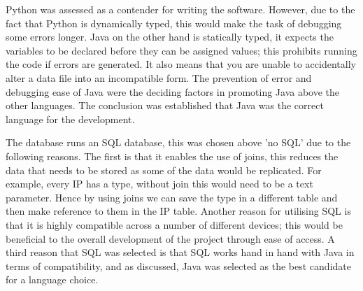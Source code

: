 Python was assessed as a contender for writing the software. However, due to the fact that Python is dynamically typed, this would make the task of debugging some errors longer. Java on the other hand is statically typed, it expects the variables to be declared before they can be assigned values; this prohibits running the code if errors are generated. It also means that you are unable to accidentally alter a data file into an incompatible form. The prevention of error and debugging ease of Java were the deciding factors in promoting Java above the other languages. The conclusion was established that Java was the correct language for the development. 

The database runs an SQL database, this was chosen above 'no SQL' due to the following reasons. The first is that it enables the use of joins, this reduces the data that needs to be stored as some of the data would be replicated. For example, every IP has a type, without join this would need to be a text parameter. Hence by using joins we can save the type in a different table and then make reference to them in the IP table. Another reason for utilising SQL is that it is highly compatible across a number of different devices; this would be beneficial to the overall development of the project through ease of access. A third reason that SQL was selected is that SQL works hand in hand with Java in terms of compatibility, and as discussed, Java was selected as the best candidate for a language choice. 

